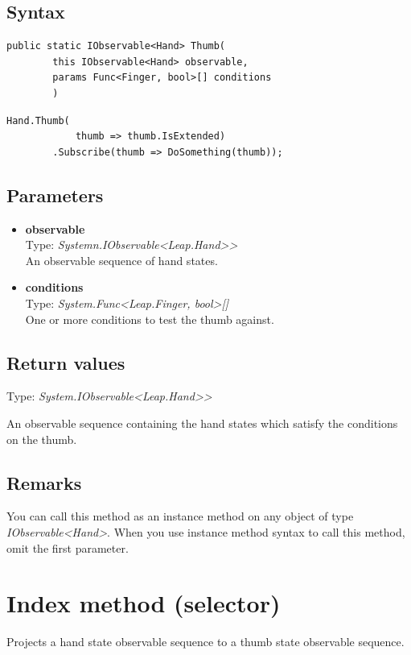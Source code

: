 \documentclass[12pt,a4paper,twoside]{report}
\begin{document}
\subsection{Syntax}
\begin{lstlisting}[caption=Declaration]
    public static IObservable<Hand> Thumb(
        this IObservable<Hand> observable,
        params Func<Finger, bool>[] conditions
        )
\end{lstlisting}

\begin{lstlisting}[caption=Usage example]
    Hand.Thumb(
            thumb => thumb.IsExtended)
        .Subscribe(thumb => DoSomething(thumb));
\end{lstlisting}

\subsection{Parameters}

\begin{itemize}
    \item \textbf{observable}\\
        Type: \textit{Systemn.IObservable<Leap.Hand>{}>}\\
        An observable sequence of hand states.
    \item \textbf{conditions}\\
        Type: \textit{System.Func<Leap.Finger, bool>[]}\\
        One or more conditions to test the thumb against.
\end{itemize}

\subsection{Return values}
Type: \textit{System.IObservable<Leap.Hand>{}>}

An observable sequence containing the hand states which satisfy the conditions on the thumb.

\subsection{Remarks}
You can call this method as an instance method on any object of type \textit{IObservable<Hand>}. When you use 
instance method syntax to call this method, omit the first parameter.

\section{Index method (selector)}
Projects a hand state observable sequence to a thumb state observable sequence.
\end{document}
